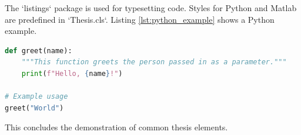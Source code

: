 The `listings` package is used for typesetting code. Styles for Python and Matlab are predefined in `Thesis.cls`.
Listing \ref{lst:python_example} shows a Python example.

\begin{lstlisting}[language=Python, caption={A simple Python function.}, label={lst:python_example}]
def greet(name):
    """This function greets the person passed in as a parameter."""
    print(f"Hello, {name}!")

# Example usage
greet("World")
\end{lstlisting}

This concludes the demonstration of common thesis elements.
